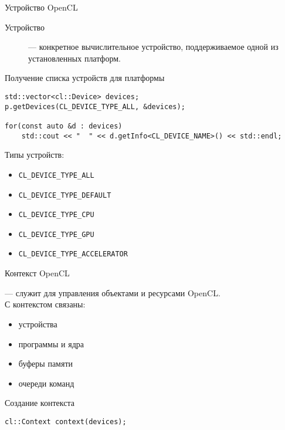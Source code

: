 \documentclass[@BEAMER_OPTIONS@]{beamer}
\newcommand{\code}[1]{\lstinline|#1|}
\begin{document}
\begin{frame}[fragile]{Устройство OpenCL}
    \begin{description}
        \item[Устройство] --- конкретное вычислительное устройство,
            поддерживаемое одной из установленных платформ.
    \end{description}
    \begin{exampleblock}{Получение списка устройств для платформы}
        \begin{lstlisting}
std::vector<cl::Device> devices;
p.getDevices(CL_DEVICE_TYPE_ALL, &devices);

for(const auto &d : devices)
    std::cout << "  " << d.getInfo<CL_DEVICE_NAME>() << std::endl;
        \end{lstlisting}
    \end{exampleblock}
    Типы устройств:
    \begin{itemize}
        \item \code{CL_DEVICE_TYPE_ALL}
        \item \code{CL_DEVICE_TYPE_DEFAULT}
        \item \code{CL_DEVICE_TYPE_CPU}
        \item \code{CL_DEVICE_TYPE_GPU}
        \item \code{CL_DEVICE_TYPE_ACCELERATOR}
    \end{itemize}
\end{frame}

\begin{frame}[fragile]{Контекст OpenCL}
    \begin{description}[\;\;]
        \item[Контекст] --- служит для управления объектами и ресурсами
            OpenCL.\\
            С контекстом связаны:
            \begin{itemize}
                \item устройства
                \item программы и ядра
                \item буферы памяти
                \item очереди команд
            \end{itemize}
    \end{description}
    \begin{exampleblock}{Создание контекста}
        \begin{lstlisting}
cl::Context context(devices);
        \end{lstlisting}
    \end{exampleblock}
\end{frame}
\end{document}
